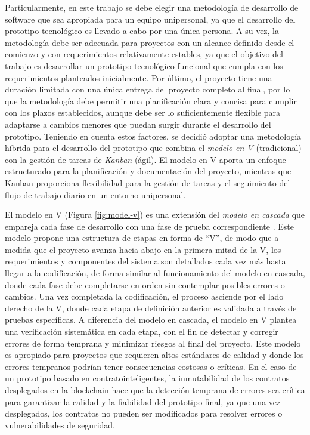 Particularmente, en este trabajo se debe elegir una metodología de desarrollo de software que sea apropiada para un equipo unipersonal, ya que el desarrollo del prototipo tecnológico es llevado a cabo por una única persona. A su vez, la metodología debe ser adecuada para proyectos con un alcance definido desde el comienzo y con requerimientos relativamente estables, ya que el objetivo del trabajo es desarrollar un prototipo tecnológico funcional que cumpla con los requerimientos planteados inicialmente. Por último, el proyecto tiene una duración limitada con una única entrega del proyecto completo al final, por lo que la metodología debe permitir una planificación clara y concisa para cumplir con los plazos establecidos, aunque debe ser lo suficientemente flexible para adaptarse a cambios menores que puedan surgir durante el desarrollo del prototipo. Teniendo en cuenta estos factores, se decidió adoptar una metodología híbrida para el desarrollo del prototipo que combina el \textit{modelo en V} (tradicional) con la gestión de tareas de \textit{Kanban} (ágil). El modelo en V aporta un enfoque estructurado para la planificación y documentación del proyecto, mientras que Kanban proporciona flexibilidad para la gestión de tareas y el seguimiento del flujo de trabajo diario en un entorno unipersonal.

El modelo en V (Figura \ref{fig:model-v}) es una extensión del \textit{modelo en cascada} que empareja cada fase de desarrollo con una fase de prueba correspondiente \cite{pressman2010ingenieria}. Este modelo propone una estructura de etapas en forma de ``V'', de modo que a medida que el proyecto avanza hacia abajo en la primera mitad de la V, los requerimientos y componentes del sistema son detallados cada vez más hasta llegar a la codificación, de forma similar al funcionamiento del modelo en cascada, donde cada fase debe completarse en orden sin contemplar posibles errores o cambios. Una vez completada la codificación, el proceso asciende por el lado derecho de la V, donde cada etapa de definición anterior es validada a través de pruebas específicas. A diferencia del modelo en cascada, el modelo en V plantea una verificación sistemática en cada etapa, con el fin de detectar y corregir errores de forma temprana y minimizar riesgos al final del proyecto. Este modelo es apropiado para proyectos que requieren altos estándares de calidad y donde los errores tempranos podrían tener consecuencias costosas o críticas. En el caso de un prototipo basado en \glspl{contratointeligente}, la inmutabilidad de los contratos desplegados en la blockchain hace que la detección temprana de errores sea crítica para garantizar la calidad y la fiabilidad del prototipo final, ya que una vez desplegados, los contratos no pueden ser modificados para resolver errores o vulnerabilidades de seguridad.

